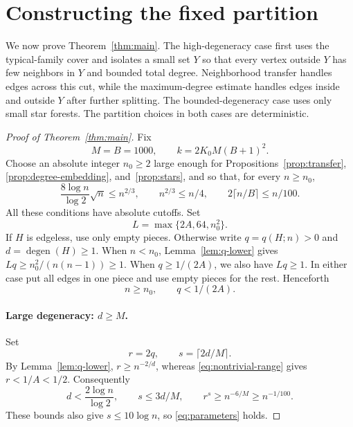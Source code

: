 \documentclass[11pt]{article}
\theoremstyle{remark}
\numberwithin{equation}{section}
\DeclareMathOperator{\degen}{degen}
\begin{document}
\section{Constructing the fixed partition}
\label{sec:assembly}

We now prove Theorem~\ref{thm:main}. The high-degeneracy case
first uses the typical-family cover and isolates a small set $Y$
so that every vertex outside $Y$ has few neighbors in $Y$ and
bounded total degree. Neighborhood transfer handles edges across
this cut, while the maximum-degree estimate handles edges inside
and outside $Y$ after further splitting. The bounded-degeneracy
case uses only small star forests. The partition choices in both
cases are deterministic.

\begin{proof}[Proof of Theorem~\ref{thm:main}]
Fix
\begin{equation}\label{eq:constants}
 M=B=1000,\qquad k=2K_0M(B+1)^2.
\end{equation}
Choose an absolute integer $n_0\geq2$ large enough for
Propositions~\ref{prop:transfer}, \ref{prop:degree-embedding},
and~\ref{prop:stars}, and so that, for every $n\geq n_0$,
\begin{equation}\label{eq:deterministic-cutoffs}
 \frac{8\log n}{\log2}\sqrt n\leq n^{2/3},\qquad
 n^{2/3}\leq n/4,\qquad
 2\lceil n/B\rceil\leq n/100.
\end{equation}
All these conditions have absolute cutoffs. Set
\[
 L=\max\{2A,64,n_0^2\}.
\]
If $H$ is edgeless, use only empty pieces. Otherwise write
$q=q(H;n)>0$ and $d=\degen(H)\geq1$.
When $n<n_0$, Lemma~\ref{lem:q-lower} gives
$Lq\geq n_0^2/(n(n-1))\geq1$. When $q\geq1/(2A)$,
we also have $Lq\geq1$. In either case put all edges in one
piece and use empty pieces for the rest. Henceforth
\begin{equation}\label{eq:nontrivial-range}
 n\geq n_0,\qquad q<1/(2A).
\end{equation}

\paragraph{Large degeneracy: $d\geq M$.}
Set
\[
 r=2q,\qquad s=\lceil2d/M\rceil.
\]
By Lemma~\ref{lem:q-lower}, $r\geq n^{-2/d}$, whereas
\eqref{eq:nontrivial-range} gives $r<1/A<1/2$. Consequently
\begin{equation}\label{eq:d-upper}
 d<\frac{2\log n}{\log2},\qquad s\leq3d/M,
 \qquad r^s\geq n^{-6/M}\geq n^{-1/100}.
\end{equation}
These bounds also give $s\leq10\log n$, so
\eqref{eq:parameters} holds.


\end{proof}
\end{document}
